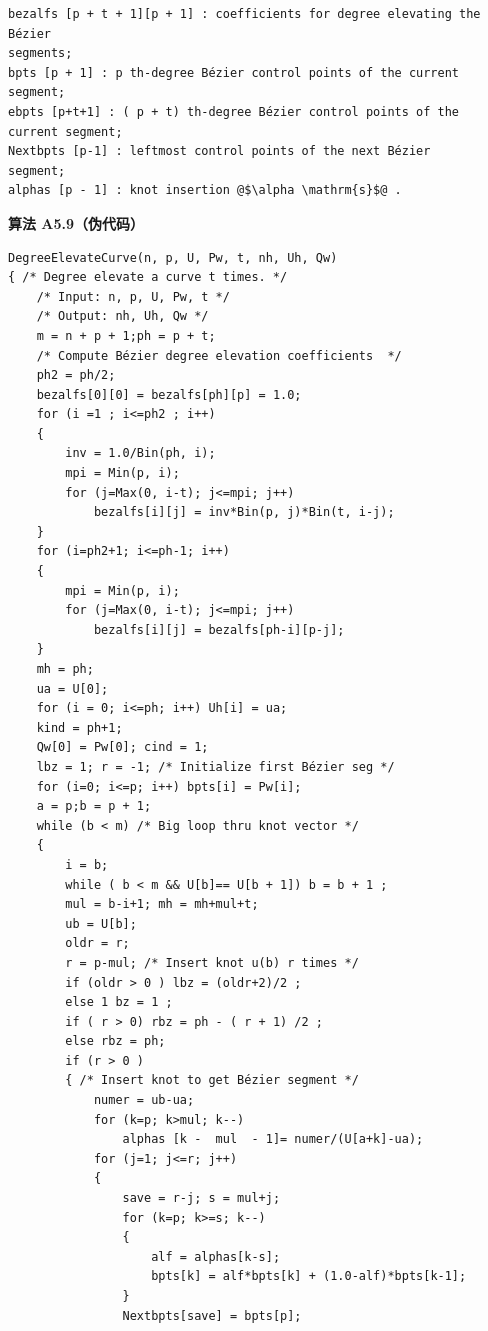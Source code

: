 \documentclass[../main.tex]{subfiles}
\begin{document}
\begin{verbatim}
bezalfs [p + t + 1][p + 1] : coefficients for degree elevating the Bézier
segments;
bpts [p + 1] : p th-degree Bézier control points of the current
segment;
ebpts [p+t+1] : ( p + t) th-degree Bézier control points of the
current segment;
Nextbpts [p-1] : leftmost control points of the next Bézier
segment;
alphas [p - 1] : knot insertion @$\alpha \mathrm{s}$@ .
\end{verbatim}

\par\medskip\noindent\textbf{算法 A5.9（伪代码）}\par
\begin{verbatim}
DegreeElevateCurve(n, p, U, Pw, t, nh, Uh, Qw)
{ /* Degree elevate a curve t times. */
    /* Input: n, p, U, Pw, t */
    /* Output: nh, Uh, Qw */
    m = n + p + 1;ph = p + t;
    /* Compute Bézier degree elevation coefficients  */
    ph2 = ph/2;
    bezalfs[0][0] = bezalfs[ph][p] = 1.0;
    for (i =1 ; i<=ph2 ; i++)
    {
        inv = 1.0/Bin(ph, i);
        mpi = Min(p, i);
        for (j=Max(0, i-t); j<=mpi; j++)
            bezalfs[i][j] = inv*Bin(p, j)*Bin(t, i-j);
    }
    for (i=ph2+1; i<=ph-1; i++)
    {
        mpi = Min(p, i);
        for (j=Max(0, i-t); j<=mpi; j++)
            bezalfs[i][j] = bezalfs[ph-i][p-j];
    }
    mh = ph;
    ua = U[0];
    for (i = 0; i<=ph; i++) Uh[i] = ua;
    kind = ph+1;
    Qw[0] = Pw[0]; cind = 1;
    lbz = 1; r = -1; /* Initialize first Bézier seg */
    for (i=0; i<=p; i++) bpts[i] = Pw[i];
    a = p;b = p + 1;
    while (b < m) /* Big loop thru knot vector */
    {
        i = b;
        while ( b < m && U[b]== U[b + 1]) b = b + 1 ;
        mul = b-i+1; mh = mh+mul+t;
        ub = U[b];
        oldr = r;
        r = p-mul; /* Insert knot u(b) r times */
        if (oldr > 0 ) lbz = (oldr+2)/2 ;
        else 1 bz = 1 ;
        if ( r > 0) rbz = ph - ( r + 1) /2 ;
        else rbz = ph;
        if (r > 0 )
        { /* Insert knot to get Bézier segment */
            numer = ub-ua;
            for (k=p; k>mul; k--)
                alphas [k -  mul  - 1]= numer/(U[a+k]-ua);
            for (j=1; j<=r; j++)
            {
                save = r-j; s = mul+j;
                for (k=p; k>=s; k--)
                {
                    alf = alphas[k-s];
                    bpts[k] = alf*bpts[k] + (1.0-alf)*bpts[k-1];
                }
                Nextbpts[save] = bpts[p];

\end{verbatim}
\end{document}

